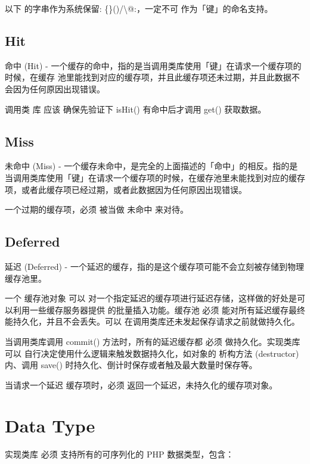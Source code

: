 以下 的字串作为系统保留: \{\}()/\textbackslash @:，一定不可 作为「键」的命名支持。


\subsection{Hit}

命中 (Hit) - 一个缓存的命中，指的是当调用类库使用「键」在请求一个缓存项的时候，在缓存 池里能找到对应的缓存项，并且此缓存项还未过期，并且此数据不会因为任何原因出现错误。

调用类 库 应该 确保先验证下 isHit() 有命中后才调用 get() 获取数据。

\subsection{Miss}

未命中 (Miss) - 一个缓存未命中，是完全的上面描述的「命中」的相反。指的是当调用类库使用「键」在请求一个缓存项的时候，在缓存池里未能找到对应的缓存项，或者此缓存项已经过期，或者此数据因为任何原因出现错误。

一个过期的缓存项，必须 被当做 未命中 来对待。


\subsection{Deferred}


延迟 (Deferred) - 一个延迟的缓存，指的是这个缓存项可能不会立刻被存储到物理缓存池里。

一个 缓存池对象 可以 对一个指定延迟的缓存项进行延迟存储，这样做的好处是可以利用一些缓存服务器提供 的批量插入功能。缓存池 必须 能对所有延迟缓存最终能持久化，并且不会丢失。可以 在调用类库还未发起保存请求之前就做持久化。

当调用类库调用 commit() 方法时，所有的延迟缓存都 必须 做持久化。实现类库 可以 自行决定使用什么逻辑来触发数据持久化，如对象的 析构方法 (destructor) 内、调用 save() 时持久化、倒计时保存或者触及最大数量时保存等。

当请求一个延迟 缓存项时，必须 返回一个延迟，未持久化的缓存项对象。

\section{Data Type}

实现类库 必须 支持所有的可序列化的 PHP 数据类型，包含：

